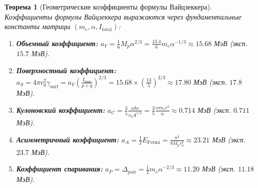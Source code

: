 \documentclass[12pt,a4paper]{article}
\newtheorem{theorem}{Теорема}[section]
\theoremstyle{definition}
\theoremstyle{remark}
\begin{document}
\begin{theorem}[Геометрические коэффициенты формулы Вайцзеккера]
	Коэффициенты формулы Вайцзеккера выражаются через фундаментальные константы матрицы $(m_e, \alpha, I_{\mathrm{total}})$:
	\begin{enumerate}
		\item \textbf{Объемный коэффициент:} $a_V = \frac{1}{6} M_p \alpha^{2/3} = \frac{13.4}{6} m_e \alpha^{-1/3} \approx 15.68$ МэВ (эксп. $15.7$ МэВ).
		\item \textbf{Поверхностный коэффициент:} $a_S = 4\pi r_0^2 \gamma_{\mathrm{surf}} = a_V \left(\frac{I_{\mathrm{base}}}{p+q}\right)^{2/3} = 15.68 \times \left(\frac{13}{5}\right)^{2/3} \approx 17.80$ МэВ (эксп. $17.8$ МэВ).
		\item \textbf{Кулоновский коэффициент:} $a_C = \frac{3}{5}\frac{\alpha \hbar c}{r_0 A^{1/3}} = \frac{3}{5}\frac{\alpha m_e c^2}{\alpha} \approx 0.714$ МэВ (эксп. $0.711$ МэВ).
		\item \textbf{Асимметричный коэффициент:} $a_A = \frac{1}{2} E_{\mathrm{Fermi}} = \frac{\pi^2}{8 M_p r_0^2} \approx 23.21$ МэВ (эксп. $23.7$ МэВ).
		\item \textbf{Коэффициент спаривания:} $a_P = \Delta_{\mathrm{pair}} = \frac{1}{2} m_e \alpha^{-2/3} \approx 11.20$ МэВ (эксп. $11.18$ МэВ).
	\end{enumerate}
\end{theorem}
\end{document}
